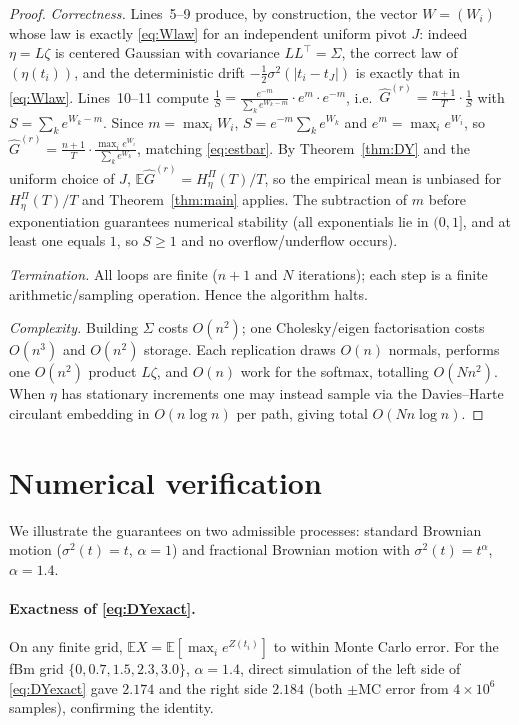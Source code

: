 \documentclass{amsart}
\theoremstyle{definition}
\newcommand{\E}{\mathbb{E}}
\begin{document}
\begin{proof}
\emph{Correctness.} Lines~5--9 produce, by construction, the vector
$W=(W_i)$ whose law is exactly \eqref{eq:Wlaw} for an independent uniform pivot
$J$: indeed $\eta=L\zeta$ is centered Gaussian with covariance
$LL^\top=\Sigma$, the correct law of $(\eta(t_i))$, and the deterministic drift
$-\tfrac12\sigma^2(|t_i-t_J|)$ is exactly that in \eqref{eq:Wlaw}. Lines~10--11
compute
$\frac1S=\frac{e^{-m}}{\sum_k e^{W_k-m}}\cdot e^{m}\cdot e^{-m}$, i.e.\
$\widehat G^{(r)}=\frac{n+1}{T}\cdot\frac1S$ with $S=\sum_k e^{W_k-m}$. Since
$m=\max_i W_i$, $S=e^{-m}\sum_k e^{W_k}$ and $e^{m}=\max_i e^{W_i}$, so
$\widehat G^{(r)}=\frac{n+1}{T}\cdot\frac{\max_i e^{W_i}}{\sum_k e^{W_k}}$,
matching \eqref{eq:estbar}. By Theorem~\ref{thm:DY} and the uniform choice of
$J$, $\E\widehat G^{(r)}=H_\eta^\Pi(T)/T$, so the empirical mean is unbiased for
$H_\eta^\Pi(T)/T$ and Theorem~\ref{thm:main} applies. The subtraction of $m$
before exponentiation guarantees numerical stability (all exponentials lie in
$(0,1]$, and at least one equals $1$, so $S\ge1$ and no overflow/underflow
occurs).

\emph{Termination.} All loops are finite ($n+1$ and $N$ iterations); each step is
a finite arithmetic/sampling operation. Hence the algorithm halts.

\emph{Complexity.} Building $\Sigma$ costs $O(n^2)$; one Cholesky/eigen
factorisation costs $O(n^3)$ and $O(n^2)$ storage. Each replication draws
$O(n)$ normals, performs one $O(n^2)$ product $L\zeta$, and $O(n)$ work for the
softmax, totalling $O(N n^2)$. When $\eta$ has stationary increments one may
instead sample via the Davies--Harte circulant embedding in $O(n\log n)$ per path,
giving total $O(N n\log n)$.
\end{proof}

\section{Numerical verification}\label{sec:num}

We illustrate the guarantees on two admissible processes:
standard Brownian motion ($\sigma^2(t)=t$, $\alpha=1$) and fractional Brownian
motion with $\sigma^2(t)=t^\alpha$, $\alpha=1.4$.

\paragraph{Exactness of \eqref{eq:DYexact}.}
On any finite grid, $\E X=\E[\max_i e^{Z(t_i)}]$ to within Monte Carlo error.
For the fBm grid $\{0,0.7,1.5,2.3,3.0\}$, $\alpha=1.4$, direct simulation of the
left side of \eqref{eq:DYexact} gave $2.174$ and the right side $2.184$
(both $\pm$MC error from $4\times10^6$ samples), confirming the identity.
\end{document}
